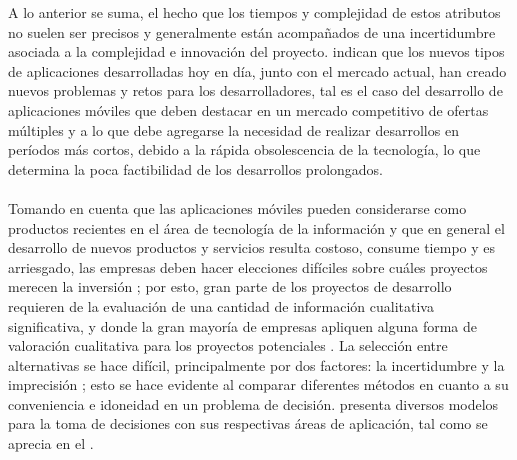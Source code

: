 A lo anterior se suma, el hecho que los tiempos y complejidad de estos atributos no suelen ser precisos y generalmente están acompañados de una incertidumbre asociada a la complejidad e innovación del proyecto.  \citet[pp. 7-8]{bergvall2013future} indican que los nuevos tipos de aplicaciones desarrolladas hoy en día, junto con el  mercado actual, han creado nuevos problemas y retos para los desarrolladores, tal es el caso del desarrollo de aplicaciones móviles que deben destacar en un mercado competitivo de ofertas múltiples y a lo que debe agregarse la necesidad de realizar desarrollos en períodos más cortos, debido a la rápida obsolescencia de la tecnología, lo que determina la poca factibilidad de los desarrollos prolongados. \\
\\
Tomando en cuenta que las aplicaciones móviles pueden considerarse como productos recientes en el área de tecnología de la información y que en general el desarrollo de nuevos productos y servicios resulta costoso, consume tiempo y es arriesgado, las empresas deben hacer elecciones difíciles sobre cuáles proyectos merecen la inversión \cite[p. 131]{schilling2008direccion};  por esto, gran parte de los proyectos de desarrollo requieren de la evaluación de una cantidad de  información cualitativa significativa, y donde la gran mayoría de empresas apliquen alguna forma de valoración cualitativa para los proyectos potenciales \cite[p. 139]{schilling2008direccion}.  La selección entre alternativas se hace difícil, principalmente por dos factores: la incertidumbre y la imprecisión \cite[p. 3]{maccrimmon1968decisionmaking}; esto se hace evidente al comparar diferentes métodos en cuanto a su conveniencia e idoneidad en un problema de decisión. \citet[p. 26-27]{albar2013investigation} presenta diversos modelos para la toma de decisiones con sus respectivas áreas de aplicación, tal como se aprecia en el . \\
\\
